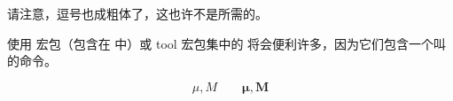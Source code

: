 %

\noindent 请注意，逗号也成粗体了，这也许不是所需的。

使用  宏包（包含在  中）或 tool 宏包集中的  将会便利许多，因为它们包含一个叫  的命令。

\ifx\boldsymbol\undefined\else
\begin{example}
\begin{displaymath}
\mu, M \qquad
\boldsymbol{\mu}, \boldsymbol{M}
\end{displaymath}
\end{example}
\fi


%

